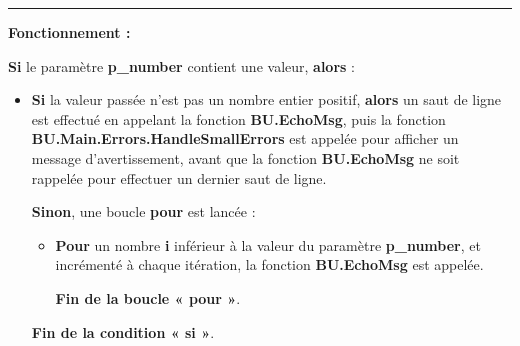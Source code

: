\documentclass[a4paper,10pt]{article}
\begin{document}

\par\noindent\rule{\textwidth}{0.4pt}

\begin{justify}
    \textbf{Fonctionnement :}

    \textbf{\color{cond}Si} le paramètre \textbf{\color{vars}p\_number} contient une valeur, \textbf{\color{cond}alors} :

    \begin{itemize}
        \item
        {
            \begin{justify}
                \textbf{\color{cond}Si} la valeur passée n'est pas un nombre entier positif, \textbf{\color{cond}alors} un saut de ligne est effectué en appelant la fonction \textbf{\color{func}BU.EchoMsg}, puis la fonction \textbf{\color{func}BU.Main.Errors.HandleSmallErrors} est appelée pour afficher un message d'avertissement, avant que la fonction \textbf{\color{func}BU.EchoMsg} ne soit rappelée pour effectuer un dernier saut de ligne.
            \end{justify}

            \setlength{\parskip}{1em}

            \begin{justify}
                \textbf{\color{cond}Sinon}, une boucle \textbf{\color{loop}pour} est lancée :

                \begin{itemize}
                    \item
                    {
                        \begin{justify}
                            \textbf{\color{loop}Pour} un nombre \textbf{\color{vars}i} inférieur à la valeur du paramètre \textbf{\color{vars}p\_number}, et incrémenté à chaque itération, la fonction \textbf{\color{func}BU.EchoMsg} est appelée.
                        \end{justify}

                        \setlength{\parskip}{1em}

                        \begin{justify}
                            \textbf{\color{loop}Fin de la boucle « pour »}.
                        \end{justify}
                    }
                \end{itemize}
            \end{justify}

            \begin{justify}
                \textbf{\color{cond}Fin de la condition « si »}.
            \end{justify}
        }
    \end{itemize}
\end{justify}
\end{document}
